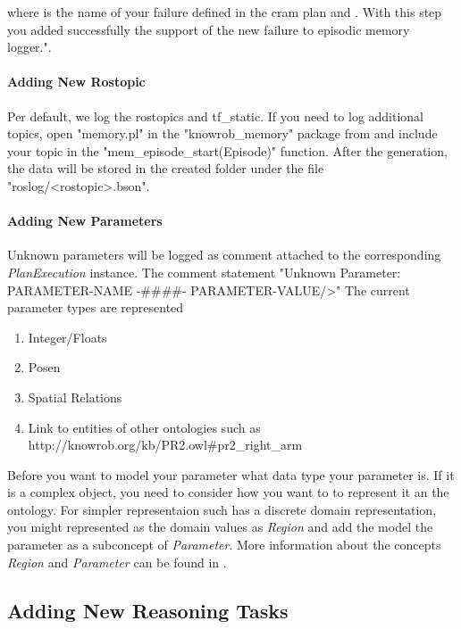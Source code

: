 where  is the name of your failure defined in the cram plan and .
With this step you added successfully the support of the new failure to \cram \neem episodic memory logger.".	

\paragraph{Adding New Rostopic}
Per default, we log the rostopics \tf and tf\_static.
If you need to log additional topics, open "memory.pl" in the "knowrob\_memory" package from \knowrob and include your topic in the "mem\_episode\_start(Episode)" function.
After the \neem generation, the data will be stored in the created \neem folder under the file "roslog/<rostopic>.bson".

\paragraph{Adding New Parameters}
Unknown parameters will be logged as comment attached to the corresponding \textit{PlanExecution} instance.
The comment statement "Unknown Parameter: PARAMETER-NAME  -\#\#\#\#- PARAMETER-VALUE/>"
The current parameter types are represented 


\begin{enumerate} 
	\item Integer/Floats
	\item Posen
	\item Spatial Relations
	\item Link to entities of other ontologies such as http://knowrob.org/kb/PR2.owl\#pr2\_right\_arm
\end{enumerate}

Before you want to model your parameter what data type your parameter is.
If it is a complex object, you need to consider how you want to to represent it an the ontology.
For simpler representaion such has a discrete domain representation, you might represented as the domain values as \textit{Region} and add the model the parameter as a subconcept of \textit{Parameter}.
More information about the concepts \textit{Region} and \textit{Parameter} can be found in .


\subsection{Adding New Reasoning Tasks}



